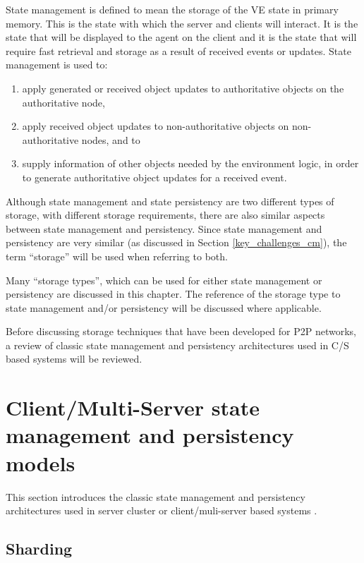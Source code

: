State management is defined to mean the storage of the VE state in primary memory. This is the state with which the server and clients will interact. It is the state that will be displayed to the agent on the client and it is the state that will require fast retrieval and storage as a result of received events or updates. State management is used to:
\begin{enumerate}
\item apply generated or received object updates to authoritative objects on the authoritative node,
\item apply received object updates to non-authoritative objects on non-authoritative nodes, and to
\item supply information of other objects needed by the environment logic, in order to generate authoritative object updates for a received event.
\end{enumerate}

Although state management and state persistency are two different types of storage, with different storage requirements, there are also similar aspects between state management and persistency. Since state management and persistency are very similar (as discussed in Section \ref{key_challenges_cm}), the term ``storage'' will be used when referring to both.

Many ``storage types'', which can be used for either state management or persistency are discussed in this chapter. The reference of the storage type to state management and/or persistency will be discussed where applicable.

Before discussing storage techniques that have been developed for P2P networks, a review of classic state management and persistency architectures used in C/S based systems will be reviewed.

\section{Client/Multi-Server state management and persistency models}
\label{cms_models}

This section introduces the classic state management and persistency architectures used in server cluster or client/muli-server based systems \cite{Hu_voronoi_IM}.

\subsection{Sharding}
\label{sharding}

